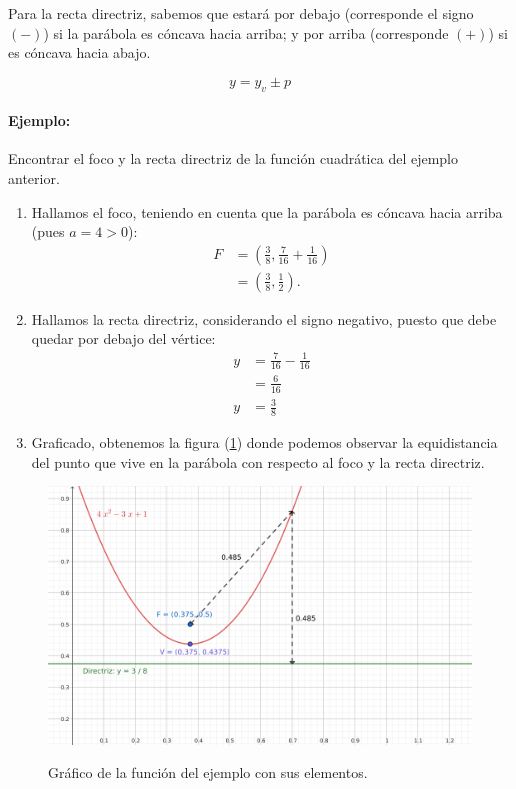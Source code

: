 \documentclass{article}
\begin{document}
Para la recta directriz, sabemos que estará por debajo (corresponde el signo $(-)$) si la parábola es cóncava hacia arriba; y por arriba (corresponde $(+)$) si es cóncava hacia abajo.

\begin{equation}
    \label{eq:directriz}
    y=y_v\pm p
\end{equation}

\paragraph{Ejemplo:} Encontrar el foco y la recta directriz de la función cuadrática del ejemplo anterior.

\begin{enumerate}
    \item Hallamos el foco, teniendo en cuenta que la parábola es cóncava hacia arriba (pues $a=4>0$):
    \begin{align*}
        F&=\left(\frac{3}{8},\frac{7}{16}+\frac{1}{16}\right)\\
        &=\left(\frac{3}{8},\frac{1}{2}\right).
    \end{align*}
    \item Hallamos la recta directriz, considerando el signo negativo, puesto que debe quedar por debajo del vértice:
    \begin{align*}
        y&=\frac{7}{16}-\frac{1}{16}\\
        &=\frac{6}{16}\\
        y&=\frac{3}{8}
    \end{align*}
    \item Graficado, obtenemos la figura (\ref{fig:graf-ej}) donde podemos observar la equidistancia del punto que vive en la parábola con respecto al foco y la recta directriz.
\end{enumerate}
\begin{figure}[b!]
    \centering
    \includegraphics[width=\linewidth]{imagen.png}
    \label{fig:graf-ej}
    \caption{Gráfico de la función del ejemplo con sus elementos.}
\end{figure}
\end{document}

